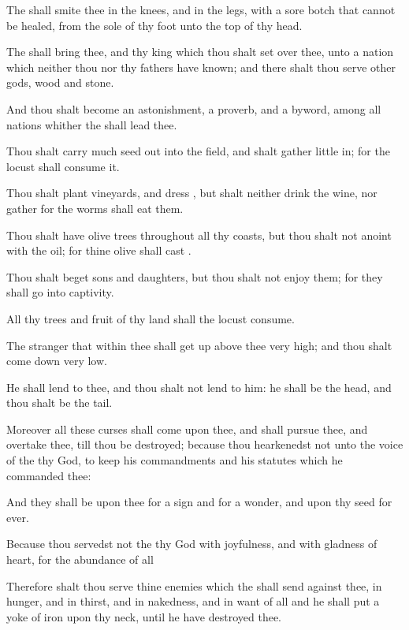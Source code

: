 {The
{} shall
smite thee in the
knees, and in the
legs, with a
sore
botch that
cannot be
healed, from the
sole of thy
foot unto the top of thy
head.

The
{} shall
bring thee, and thy
king which thou shalt
set over thee, unto a
nation which neither thou nor thy
fathers have
known; and there shalt thou
serve
other
gods,
wood and
stone.

And thou shalt become an
astonishment, a
proverb, and a
byword, among all
nations whither the
{} shall
lead thee.

Thou shalt
carry
much
seed
out into the
field, and shalt
gather
{}
little
in; for the
locust shall
consume it.

Thou shalt
plant
vineyards, and
dress
{}, but shalt neither
drink
{} the
wine, nor
gather
{} for the
worms shall
eat them.

Thou shalt have olive
trees throughout all thy
coasts, but thou shalt not
anoint
{} with the
oil; for thine
olive shall
cast
{}.

Thou shalt
beget
sons and
daughters, but thou shalt not enjoy them; for they shall
go into
captivity.

All thy
trees and
fruit of thy
land shall the
locust
consume.

The
stranger that
{}
within thee shall get
up above thee
very
high; and thou shalt come
down
very
low.

He shall
lend to thee, and thou shalt not
lend to him: he shall be the
head, and thou shalt be the
tail.


\par }{\PP {}Moreover all these
curses shall
come upon thee, and shall
pursue thee, and
overtake thee, till thou be
destroyed; because thou
hearkenedst not unto the
voice of the
{} thy
God, to
keep his
commandments and his
statutes which he
commanded thee:

And they shall be upon thee for a
sign and for a
wonder, and upon thy
seed
for
ever.

Because thou
servedst not the
{} thy
God with
joyfulness, and with
gladness of
heart, for the
abundance of all
{}

Therefore shalt thou
serve thine
enemies which the
{} shall
send against thee, in
hunger, and in
thirst, and in
nakedness, and in
want of all
{} and he shall
put a
yoke of
iron upon thy
neck, until he have
destroyed thee.

}
